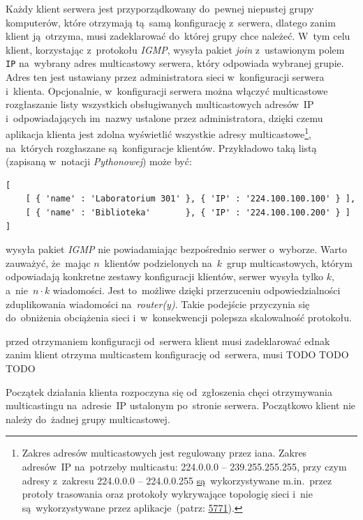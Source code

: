 \documentclass[thesis]{subfiles}
\begin{document}
Każdy klient serwera jest przyporządkowany do~pewnej niepustej grupy komputerów, które otrzymają tą~samą konfigurację z~serwera, dlatego zanim klient ją~otrzyma, musi zadeklarować do~której grupy chce należeć. W~tym celu klient, korzystając z~protokołu \emph{IGMP}, wysyła pakiet \emph{join} z~ustawionym polem \texttt{IP} na~wybrany adres multicastowy serwera, który odpowiada wybranej grupie. Adres ten jest ustawiany przez administratora sieci w~konfiguracji serwera i~klienta. Opcjonalnie, w~konfiguracji serwera można włączyć multicastowe rozgłaszanie listy wszystkich obsługiwanych multicastowych adresów~IP i~odpowiadających im~nazwy ustalone przez administratora, dzięki czemu aplikacja klienta jest zdolna wyświetlić wszystkie adresy multicastowe\footnote{Zakres adresów multicastowych jest regulowany przez \gls{iana}. Zakres adresów~IP na~potrzeby multicastu: 224.0.0.0 -- 239.255.255.255, przy czym adresy z~zakresu 224.0.0.0 -- 224.0.0.255 \href{https://www.iana.org/assignments/multicast-addresses/multicast-addresses.xhtml}{są}~wykorzystywane m.in.~przez protoły trasowania oraz protokoły wykrywające topologię sieci i~nie są~wykorzystywane przez aplikacje~(patrz: \href{https://tools.ietf.org/html/rfc5771}{5771}).}, na~których rozgłaszane są~konfiguracje klientów. Przykładowo taką listą (zapisaną w~notacji \emph{Pythonowej}) może być:
\begin{lstlisting}[numbers=none,frame=none]
[
	[ { 'name' : 'Laboratorium 301' }, { 'IP' : '224.100.100.100' } ],
	[ { 'name' : 'Biblioteka'       }, { 'IP' : '224.100.100.200' } ]
]
\end{lstlisting}

 wysyła pakiet \emph{IGMP} nie powiadamiając bezpośrednio serwer o~wyborze. Warto zauważyć, że~mając $n$~klientów podzielonych na~$k$~grup multicastowych, którym odpowiadają konkretne zestawy konfiguracji klientów, serwer wysyła tylko $k$, a~nie~$n\cdot k$ wiadomości. Jest to~możliwe dzięki przerzuceniu odpowiedzialności zduplikowania wiadomości na~\emph{router(y)}. Takie podejście przyczynia się do~obniżenia obciążenia sieci i~w~konsekwencji polepsza skalowalność protokołu.

przed otrzymaniem konfiguracji od~serwera klient musi zadeklarować ednak zanim klient otrzyma multicastem konfigurację od~serwera, musi TODO TODO TODO

Początek działania klienta rozpoczyna się od~zgłoszenia chęci otrzymywania multicastingu na~adresie~IP ustalonym po~stronie serwera. Początkowo klient nie należy do~żadnej grupy multicastowej.
\end{document}
